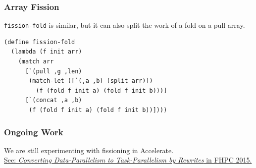 \documentclass[12pt,letterpaper]{beamer}
\begin{document}
\begin{frame}[fragile]
\frametitle{Array Fission}
{\tt fission-fold} is similar, but it can also split the work 
of a fold on a pull array.
\begin{lstlisting}
(define fission-fold
  (lambda (f init arr)
    (match arr
      [`(pull ,g ,len)
       (match-let ([`(,a ,b) (split arr)])
         (f (fold f init a) (fold f init b)))]
      [`(concat ,a ,b)
       (f (fold f init a) (fold f init b))])))
\end{lstlisting}
\end{frame}

\begin{frame}
  \frametitle{Ongoing Work}
  We are still experimenting with fissioning in Accelerate. \\
  \hyperlink{http://dl.acm.org/citation.cfm?id=2808093}{See: {\em Converting Data-Parallelism to Task-Parallelism by Rewrites} in FHPC 2015.}
\end{frame}
\end{document}
